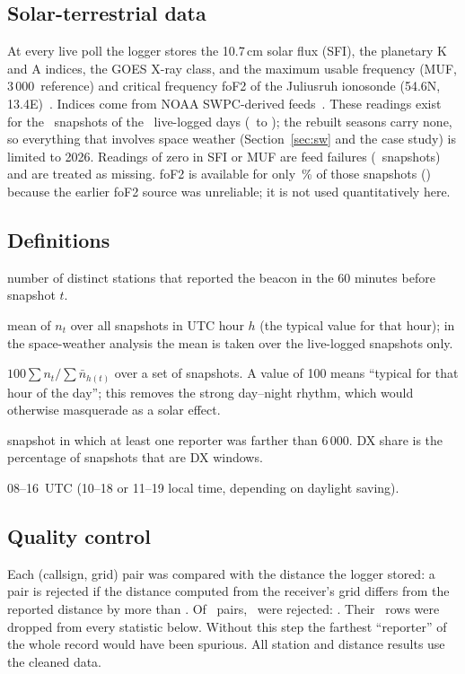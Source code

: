 \documentclass[10pt,a4paper]{article}
\begin{document}
\subsection{Solar-terrestrial data}
At every live poll the logger stores the 10.7\,cm solar flux (SFI), the planetary K and A indices, the GOES X-ray class, and the maximum usable frequency (MUF, 3\,000\km\ reference) and critical frequency foF2 of the Juliusruh ionosonde (54.6\textdegree N, 13.4\textdegree E)~\cite{giro,juliusruh}. Indices come from NOAA SWPC-derived feeds~\cite{swpc,hamqsl}. These readings exist for the \swSnap\ snapshots of the \swDays\ live-logged days (\swFrom\ to \swTo); the rebuilt seasons carry none, so everything that involves space weather (Section~\ref{sec:sw} and the case study) is limited to 2026. Readings of zero in SFI or MUF are feed failures (\solarZeroSFI\ snapshots) and are treated as missing. foF2 is available for only \pctFofC\,\% of those snapshots (\nFofC) because the earlier foF2 source was unreliable; it is not used quantitatively here.

\subsection{Definitions}
\begin{description}[leftmargin=1.2em,style=nextline]
\item[Reporters $n_t$] number of distinct stations that reported the beacon in the 60 minutes before snapshot $t$.
\item[Expected reporters $\bar n_h$] mean of $n_t$ over all snapshots in UTC hour $h$ (the typical value for that hour); in the space-weather analysis the mean is taken over the live-logged snapshots only.
\item[Index] $100\sum n_t/\sum\bar n_{h(t)}$ over a set of snapshots. A value of 100 means ``typical for that hour of the day''; this removes the strong day--night rhythm, which would otherwise masquerade as a solar effect.
\item[DX window] snapshot in which at least one reporter was farther than 6\,000\km. DX share is the percentage of snapshots that are DX windows.
\item[Daytime] 08--16~UTC (10--18 or 11--19 local time, depending on daylight saving).
\end{description}

\subsection{Quality control}\label{sec:qc}
Each (callsign, grid) pair was compared with the distance the logger stored: a pair is rejected if the distance computed from the receiver's grid differs from the reported distance by more than \qcTol\km. Of \qcPairs\ pairs, \qcFlagged\ were rejected: \qcList. Their \qcRowsAll\ rows were dropped from every statistic below. Without this step the farthest ``reporter'' of the whole record would have been spurious. All station and distance results use the cleaned data.
\end{document}
